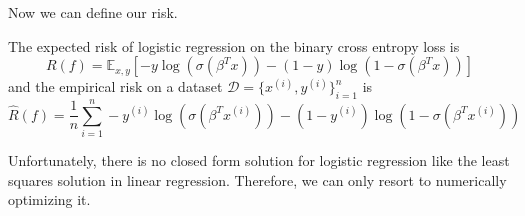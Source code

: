   Now we can define our risk. 

  \begin{theorem}[Risk]
    The expected risk of logistic regression on the binary cross entropy loss is 
    \begin{equation}
      R(f) = \mathbb{E}_{x, y} \left[ -y \log(\sigma(\beta^T x)) - (1 - y) \log(1 - \sigma(\beta^T x)) \right]
    \end{equation} 
    and the empirical risk on a dataset $\mathcal{D} = \{x^{(i)}, y^{(i)}\}_{i=1}^n$ is 
    \begin{equation}
      \hat{R}(f) = \frac{1}{n} \sum_{i=1}^n -y^{(i)} \log(\sigma(\beta^T x^{(i)})) - (1 - y^{(i)}) \log(1 - \sigma(\beta^T x^{(i)}))
    \end{equation}
  \end{theorem}

  Unfortunately, there is no closed form solution for logistic regression like the least squares solution in linear regression. Therefore, we can only resort to numerically optimizing it. 


